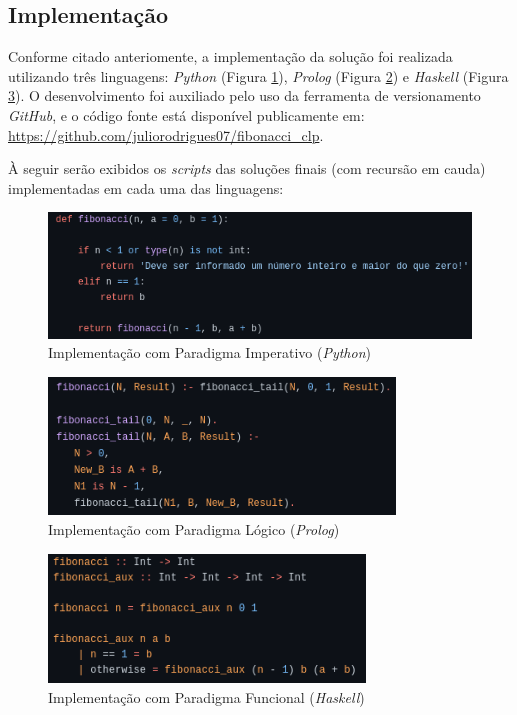 \documentclass[a4paper, 12pt]{article}
\begin{document}
\subsection{Implementação}

Conforme citado anteriomente, a implementação da solução foi realizada utilizando três linguagens: \emph{Python} (Figura \ref{fig:exampleFig1}), \emph{Prolog} (Figura \ref{fig:exampleFig2}) e \emph{Haskell} (Figura \ref{fig:exampleFig3}). O desenvolvimento foi auxiliado pelo uso da ferramenta de versionamento \emph{GitHub}, e o código fonte está disponível publicamente em: \url{https://github.com/juliorodrigues07/fibonacci_clp}.

À seguir serão exibidos os \emph{scripts} das soluções finais (com recursão em cauda) implementadas em cada uma das linguagens:

\begin{figure}[H]
    \centering
    \includegraphics[width=1\textwidth]{Images/python.png}
    \caption{Implementação com Paradigma Imperativo (\emph{Python})}
    \label{fig:exampleFig1}
\end{figure}

\begin{figure}[H]
    \centering
    \includegraphics[width=0.82\textwidth]{Images/prolog.png}
    \caption{Implementação com Paradigma Lógico (\emph{Prolog})}
    \label{fig:exampleFig2}
\end{figure}

\begin{figure}[H]
    \centering
    \includegraphics[width=0.75\textwidth]{Images/haskell.png}
    \caption{Implementação com Paradigma Funcional (\emph{Haskell})}
    \label{fig:exampleFig3}
\end{figure}
\end{document}
